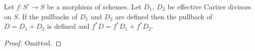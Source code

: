 \begin{lemma}
\label{lemma-pullback-effective-Cartier-divisors-additive}
Let $f : S' \to S$ be a morphism of schemes.
Let $D_1$, $D_2$ be effective Cartier divisors on $S$.
If the pullbacks of $D_1$ and $D_2$ are defined then the
pullback of $D = D_1 + D_2$ is defined and
$f^*D = f^*D_1 + f^*D_2$.
\end{lemma}

\begin{proof}
Omitted.
\end{proof}





